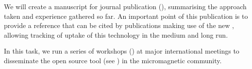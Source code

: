 \begin{workpackage}[id=dissem,wphases=18-48!.5,
  title=Dissemination,
  SARM=1,
  USORM=10,
  USHRM=8,
  USRM=24
]
\begin{tasklist}
\begin{task}[id=dissemination-of-oommf-nb-virtual-environment,
  title=Open source dissemination of \OOMMFNB{} virtual environment]
  We will create a manuscript for journal publication (), summarising the
  approach taken and experience gathered so far. An important point of
  this publication is to provide a reference that can be cited by
  publications making use of the new \OOMMFNB, allowing tracking of
  uptake of this technology in the medium and long run.
\end{task}

\begin{task}[title=\OOMMFNB{} open source dissemination workshops,
id=dissemination-of-oommf-nb-workshops]



  In this task, we run a series of workshops () at major international
  meetings to disseminate the open source \OOMMFNB{} tool (see 
) in the
  micromagnetic community.


\end{task}
\end{tasklist}
\end{workpackage}
